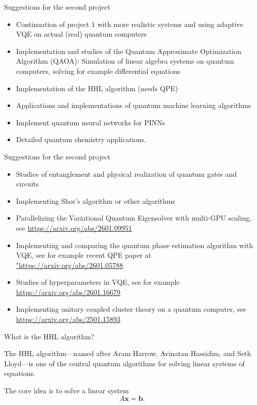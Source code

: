 \documentclass{beamer}
\begin{document}
\begin{frame}{Suggestions for the second project}
\begin{itemize}
\item Continuation of project 1 with  more realistic systems and using adaptive VQE on actual (real) quantum computers
\item Implementation and studies of the Quantum Approximate Optimization Algorithm (QAOA): Simulation of linear algebra systems on quantum computers, solving for example differential equations
\item Implementation of the HHL algorithm (needs QPE)
\item Applications and implementations of quantum machine learning algorithms
\item Implement quantum neural networks for PINNs
\item Detailed quantum chemistry applications.
\end{itemize}
\end{frame}



\begin{frame}{Suggestions for the second project}
\begin{itemize}
\item Studies of entanglement and physical realization of quantum gates and circuits
\item Implementing Shor's algorithm or other algorithms
\item Parallelizing the Variational Quantum Eigensolver with multi-GPU scaling, see \url{https://arxiv.org/abs/2601.09951}
\item Implementing and comparing the quantum phase estimation algorithm with VQE, see for example recent QPE paper at \url{"https://arxiv.org/abs/2601.05788}
\item Studies of hyperparameters in VQE, see for example \url{https://arxiv.org/abs/2601.16679}
\item Implementing unitary coupled cluster theory on a quantum computer, see \url{https://arxiv.org/abs/2501.15893}
\end{itemize}
\end{frame}


\begin{frame}{What is the HHL algorithm?}

The HHL algorithm—named after Aram Harrow, Avinatan Hassidim, and Seth
Lloyd—is one of the central quantum algorithms for solving linear
systems of equations.

The core idea is to solve a linear system
\[
A \mathbf{x} = \mathbf{b}.
\]
\end{frame}
\end{document}
